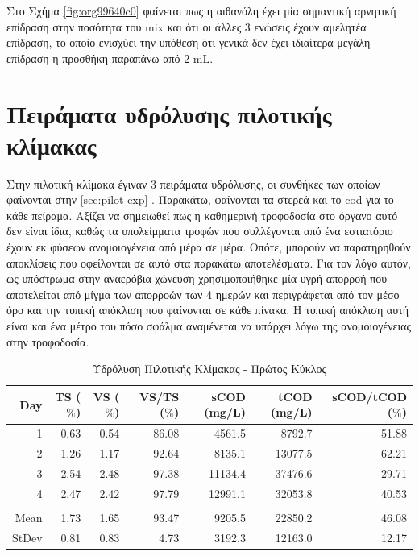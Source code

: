 \documentclass[11pt]{report}
\begin{document}
Στο Σχήμα \ref{fig:org99640c0} φαίνεται πως η αιθανόλη έχει μία σημαντική αρνητική επίδραση στην ποσότητα του \acrshort{mix} και ότι οι άλλες 3 ενώσεις έχουν αμελητέα επίδραση, το οποίο ενισχύει την υπόθεση ότι γενικά δεν έχει ιδιαίτερα μεγάλη επίδραση η προσθήκη παραπάνω από 2 mL.

\section{Πειράματα υδρόλυσης πιλοτικής κλίμακας}
\label{sec:orgffc888f}
Στην πιλοτική κλίμακα έγιναν 3 πειράματα υδρόλυσης, οι συνθήκες των οποίων φαίνονται στην \autoref{sec:pilot-exp} . Παρακάτω, φαίνονται τα στερεά και το \acrshort{cod} για το κάθε πείραμα. Αξίζει να σημειωθεί πως η καθημερινή τροφοδοσία στο όργανο αυτό δεν είναι ίδια, καθώς τα υπολείμματα τροφών που συλλέγονται από ένα εστιατόριο έχουν εκ φύσεων ανομοιογένεια από μέρα σε μέρα. Οπότε, μπορούν να παρατηρηθούν αποκλίσεις που οφείλονται σε αυτό στα παρακάτω αποτελέσματα. Για τον λόγο αυτόν, ως υπόστρωμα στην αναερόβια χώνευση χρησιμοποιήθηκε μία υγρή απορροή που αποτελείται από μίγμα των απορροών των 4 ημερών και περιγράφεται από τον μέσο όρο και την τυπική απόκλιση που φαίνονται σε κάθε πίνακα. Η τυπική απόκλιση αυτή είναι και ένα μέτρο του πόσο σφάλμα αναμένεται να υπάρχει λόγω της ανομοιογένειας στην τροφοδοσία.

\begin{table}[htbp]
\caption{\label{tab:org8683560}Υδρόλυση Πιλοτικής Κλίμακας - Πρώτος Κύκλος}
\centering
\begin{tabular}{rrrrrrr}
Day & TS (\(\%\)) & VS (\(\%\)) & VS/TS (\(\%\)) & sCOD (mg/L) & tCOD (mg/L) & sCOD/tCOD (\(\%\))\\[0pt]
\hline
1 & 0.63 & 0.54 & 86.08 & 4561.5 & 8792.7 & 51.88\\[0pt]
2 & 1.26 & 1.17 & 92.64 & 8135.1 & 13077.5 & 62.21\\[0pt]
3 & 2.54 & 2.48 & 97.38 & 11134.4 & 37476.6 & 29.71\\[0pt]
4 & 2.47 & 2.42 & 97.79 & 12991.1 & 32053.8 & 40.53\\[0pt]
 &  &  &  &  &  & \\[0pt]
Mean & 1.73 & 1.65 & 93.47 & 9205.5 & 22850.2 & 46.08\\[0pt]
StDev & 0.81 & 0.83 & 4.73 & 3192.3 & 12163.0 & 12.17\\[0pt]
\end{tabular}
\end{table}
\end{document}
